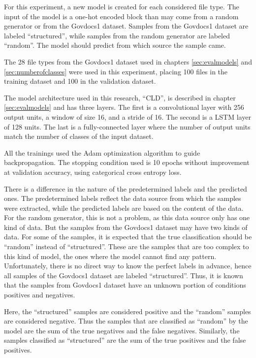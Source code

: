 For this experiment, a new model is created for each considered file type. The input of the model is a one-hot encoded block than may come from a random generator or from the Govdocs1 dataset. Samples from the Govdocs1 dataset are labeled ``structured'', while samples from the random generator are labeled ``random''. The model should predict from which source the sample came.

The 28 file types from the Govdocs1 dataset \cite{garfinkel_bringing_2009} used in chapters \ref{sec:evalmodels} and \ref{sec:numberofclasses} were used in this experiment, placing 100 files in the training dataset and 100 in the validation dataset.


The model architecture used in this research, ``CLD'', is described in chapter \ref{sec:evalmodels} and has three layers. The first is a convolutional layer with 256 output units, a window of size 16, and a stride of 16. The second is a LSTM layer of 128 units. The last is a fully-connected layer where the number of output units match the number of classes of the input dataset.

All the trainings used the Adam \cite{kingma_adam:_2014}
optimization algorithm to guide backpropagation.
The stopping condition used is 10 epochs without improvement at validation accuracy, using categorical cross entropy loss.


There is a difference in the nature of the predetermined labels and the predicted ones. The predetermined labels reflect the data source from which the samples were extracted, while the predicted labels are based on the content of the data. For the random generator, this is not a problem, as this data source only has one kind of data. But the samples from the Govdocs1 dataset may have two kinds of data. For some of the samples, it is expected that the true classification should be ``random'' instead of ``structured''. These are the samples that are too complex to this kind of model, the ones where the model cannot find any pattern. Unfortunately, there is no direct way to know the perfect labels in advance, hence all samples of the Govdocs1 dataset are labeled ``structured''. Thus, it is known that the samples from Govdocs1 dataset have an unknown portion of conditions positives and negatives.

Here, the ``structured'' samples are considered positive and the ``random'' samples are considered negative. Thus the samples that are classified as ``random'' by the model are the sum of the true negatives and the false negatives. Similarly, the samples classified as ``structured'' are the sum of the true positives and the false positives.

